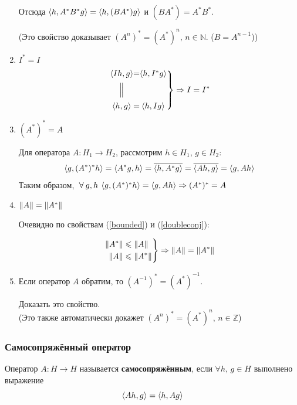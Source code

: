 \documentclass[12pt]{article}
\begin{document}
\begin{enumerate}
				Отсюда $\left\langle h, A^{*}B^{*}g \right\rangle = \left\langle h, (BA^{*})g \right\rangle$ и $(BA^{*}) = A^{*}B^{*}$.
		
				{\Large(}Это свойство доказывает $(A^n)^{*} = (A^{*})^n,\, n \in \mathbb{N}$. ($B=A^{n-1}$){\Large)} \\
		
				\item $I^{*} = I$
				$$
				\left.
				\begin{CD}
					\scal{Ih}{g} @. = @. \scal{h}{I^{*}g} \\
						@| \\
					\scal{h}{g} @. = @. \scal{h}{Ig}
				\end{CD}
				\right\} \Rightarrow I = I^{*}
				$$
		
				\item $(A^{*})^{*} = A$ \label{doubleconj}
		
				Для оператора $A: H_1 \rightarrow H_2$, рассмотрим $h \in H_1$, $g \in H_2$:
				$$
					\left\langle g, (A^{*})^{*}h \right\rangle = \left\langle A^{*}g, h \right\rangle = \overline{\left\langle h, A^{*}g \right\rangle} = 
					\overline{\left\langle Ah, g \right\rangle} = \left\langle g, Ah \right\rangle
				$$
				Таким образом, $\forall g,h \: \scal{g}{(A^{*})^{*}h} = \scal{g}{Ah} \Rightarrow (A^{*})^{*} = A$
		
				\item $\left\| A \right\| = \left\| A^{*} \right\|$
		
				Очевидно по свойствам (\ref{bounded}) и (\ref{doubleconj}):
		
				$$
				\left.
				\begin{aligned}
					\left\| A^{*} \right\| &\leqslant \left\| A \right\| \\
					\left\| A \right\| &\leqslant \left\| A^{*} \right\|
				\end{aligned}
				\right\}
				\Rightarrow \left\| A \right\| = \left\| A^{*} \right\|
				$$
		
				\item Если оператор $A$ обратим, то $(A^{-1})^{*} = (A^{*})^{-1}$.
		
				\exc Доказать это свойство. \\
				{\Large(}Это также автоматически докажет $(A^n)^{*} = (A^{*})^n,\, n \in \mathbb{Z}${\Large)}
			\end{enumerate}
	
		\subsubsection{Самосопряжённый оператор}
	
			\begin{defi}
				Оператор $A : H \rightarrow H$ называется \textbf{самосопряжённым}, если $\forall h,\, g \in H$ выполнено выражение
				$$\left\langle Ah, g \right\rangle = \left\langle h, Ag \right\rangle$$
			\end{defi}
	
\end{document}

